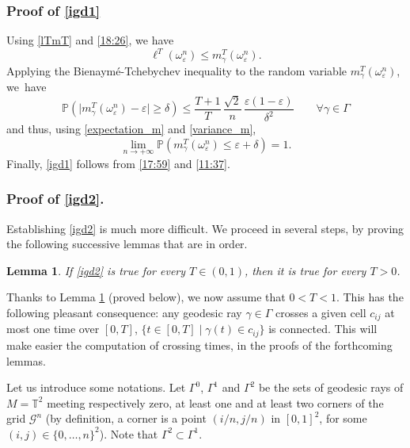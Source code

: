 \documentclass[JEP,XML,SOM,Unicode, NoEqCountersInSection,NoFloatCountersInSection,published]{cedram}
\newtheorem{lemma}{Lemma}
\theoremstyle{definition}
\begin{document}
\subsubsection*{Proof of \eqref{igd1}}
Using \eqref{lTmT} and \eqref{18:26}, we have
\begin{equation}\label{17:59}
\ell^T(\omega_\varepsilon^n) \leq m^T_\gamma(\omega_\varepsilon^n).
\end{equation}
Applying the Bienaymé-Tchebychev inequality to the random variable $m^T_\gamma(\omega_\varepsilon^n)$, we~have
\[
\mathbb{P}\left( \vert m^T_\gamma(\omega_\varepsilon^n)-\varepsilon \vert\geq \delta \right) \leq \frac{T+1}{T}\, \frac{\sqrt{2}}{n}\,\frac{\varepsilon(1-\varepsilon)}{\delta^2} \qquad\forall\gamma\in\Gamma
\]
and thus, using \eqref{expectation_m} and \eqref{variance_m},
\begin{equation}\label{11:37}
\lim_{n\to +\infty} \mathbb{P}\left( m^T_\gamma(\omega_\varepsilon^n) \leq \varepsilon + \delta\right) = 1.
\end{equation}
Finally, \eqref{igd1} follows from \eqref{17:59} and \eqref{11:37}.

\subsubsection*{Proof of \eqref{igd2}.} Establishing \eqref{igd2} is much more difficult. We proceed in several steps, by proving the following successive lemmas that are in order.

\begin{lemma} \label{lem:smallT}
If \eqref{igd2} is true for every $T \in (0,1)$, then it is true for every $T>0$.
\end{lemma}

Thanks to Lemma \ref{lem:smallT} (proved below), we now assume that $0<T<1$.
{This has the following pleasant consequence: any geodesic ray $\gamma\in\Gamma$ crosses a given cell $c_{ij}$ at most one time over $[0,T]$, \ie $\{ t\in[0,T]\mid \gamma(t)\in c_{ij}\}$ is connected. This will make easier the computation of crossing times, in the proofs of the forthcoming lemmas.}

Let us introduce some notations. Let $\Gamma^0$, $\Gamma^1$ and $\Gamma^2$ be the sets of geodesic rays of $M=\mathbb{T}^2$ meeting respectively zero, at least one and at least two corners of the grid $\mathcal{G}^n$ (by definition, a corner is a point $(i/n,j/n)$ in $[0,1]^2$, for some $(i,j)\in\{0,\ldots,n\}^2$).
{Note that $\Gamma^2\subset \Gamma^1$.}
\end{document}
